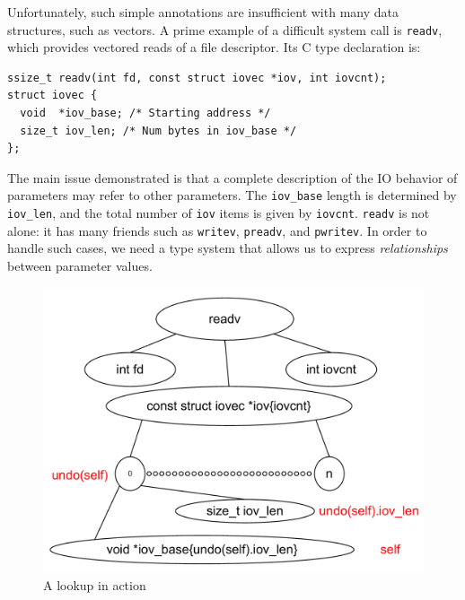 Unfortunately, such simple annotations are insufficient with many data
structures, such as vectors. A prime example of a difficult system
call is \texttt{readv}, which provides vectored reads of a file
descriptor. Its C type declaration is:
\begin{lstlisting}
ssize_t readv(int fd, const struct iovec *iov, int iovcnt);
struct iovec {
  void  *iov_base; /* Starting address */
  size_t iov_len; /* Num bytes in iov_base */
};
\end{lstlisting}
The main issue demonstrated is that a complete description of the IO behavior of
parameters may refer to other parameters.  The {\tt iov\_base} length
is determined by {\tt iov\_len}, and the total number of {\tt iov}
items is given by {\tt iovcnt}.  \texttt{readv} is not alone: it has
many friends such as \texttt{writev}, \texttt{preadv}, and
\texttt{pwritev}. In order to handle such cases, we need a type system
that allows us to express \emph{relationships} between parameter values.



\begin{figure}
	\begin{center}
\includegraphics[scale=0.4]{tachyon/LookupDiagram.pdf}
	\end{center}
\caption{A lookup in action}
\label{tach:fig:lookup}
\end{figure}



